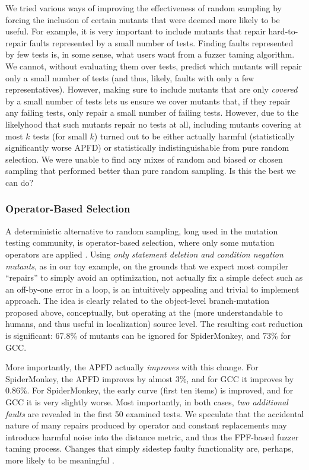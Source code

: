 We tried various ways of improving the effectiveness of random sampling by forcing the inclusion of certain mutants that were deemed more likely to be useful.  For example, it is very important to include mutants that repair hard-to-repair faults represented by a small number of tests.  Finding faults represented by few tests is, in some sense, what users want from a fuzzer taming algorithm.  We cannot, without evaluating them over tests, predict which mutants will repair only a small number of tests (and thus, likely, faults with only a few representatives).  However, making sure to include mutants that are only \emph{covered} by a small number of tests lets us ensure we cover mutants that, if they repair any failing tests, only repair a small number of failing tests.  However, due to the likelyhood that such mutants repair no tests at all, including mutants covering at most $k$ tests (for small $k$) turned out to be either actually harmful (statistically significantly worse APFD) or statistically indistinguishable from pure random selection.  We were unable to find any mixes of random and biased or chosen sampling that performed better than pure random sampling.  Is this the best we can do?


\subsubsection{Operator-Based Selection}

A deterministic alternative to random sampling, long used in the mutation testing community, is operator-based selection, where only some mutation operators are applied \cite{wong1995reducing,untch2009onreduced}.  Using \emph{only statement deletion and condition negation mutants}, as in our toy example, on the grounds that we expect most compiler ``repairs'' to simply avoid an optimization, not actually fix a simple defect such as an off-by-one error in a loop, is an intuitively appealing and trivial to implement approach.  The idea is clearly related to the object-level branch-mutation proposed above, conceptually, but operating at the (more understandable to humans, and thus useful in localization) source level.  The resulting cost reduction is significant:  67.8\% of mutants can be ignored for SpiderMonkey, and 73\% for GCC.

More importantly, the APFD actually \emph{improves} with this change.  For SpiderMonkey, the APFD improves by almost 3\%, and for GCC it improves by 0.86\%.  For SpiderMonkey, the early curve (first ten items) is improved, and for GCC it is very slightly worse.  Most importantly, in both cases, \emph{two additional faults} are revealed in the first 50 examined tests.  We speculate that the accidental nature of many repairs produced by operator and constant replacements may introduce harmful noise into the distance metric, and thus the FPF-based fuzzer taming process.  Changes that simply sidestep faulty functionality are, perhaps, more likely to be meaningful \cite{achour}.

